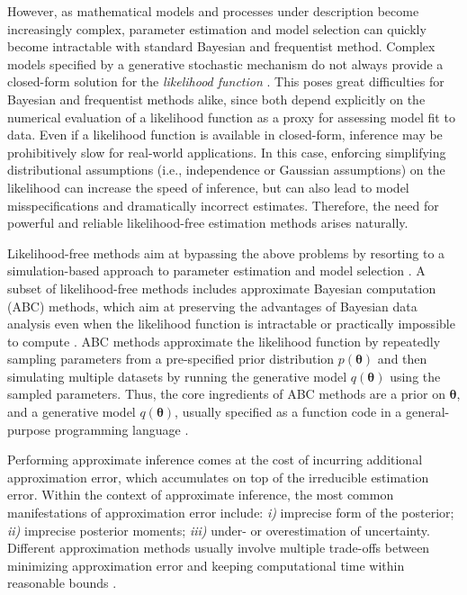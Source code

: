 \documentclass[9pt,twoside,lineno]{pnas-new}
\begin{document}
However, as mathematical models and processes under description become increasingly complex, parameter estimation and model selection can quickly become intractable with standard Bayesian and frequentist method. Complex models specified by a generative stochastic mechanism do not always provide a closed-form solution for the \textit{likelihood function} \cite{palestro2018likelihood, csillery2010approximate, toni2009simulation}. This poses great difficulties for Bayesian and frequentist methods alike, since both depend explicitly on the numerical evaluation of a likelihood function as a proxy for assessing model fit to data. Even if a likelihood function is available in closed-form, inference may be prohibitively slow for real-world applications. In this case, enforcing simplifying distributional assumptions (i.e., independence or Gaussian assumptions) on the likelihood can increase the speed of inference, but can also lead to model misspecifications and dramatically incorrect estimates. Therefore, the need for powerful and reliable likelihood-free estimation methods arises naturally. 

Likelihood-free methods aim at bypassing the above problems by resorting to a simulation-based approach to parameter estimation and model selection \cite{palestro2018likelihood, turner2014generalized}. A subset of likelihood-free methods includes approximate Bayesian computation (ABC) methods, which aim at preserving the advantages of Bayesian data analysis even when the likelihood function is intractable or practically impossible to compute \cite{turner2014generalized, sunnaaker2013approximate, csillery2010approximate}. ABC methods approximate the likelihood function by repeatedly sampling parameters from a pre-specified prior distribution $p(\boldsymbol{\theta})$ and then simulating multiple datasets by running the generative model $q(\boldsymbol{\theta})$ using the sampled parameters. Thus, the core ingredients of ABC methods are a prior on $\boldsymbol{\theta}$, and a generative model $q(\boldsymbol{\theta})$, usually specified as a function code in a general-purpose programming language \cite{csillery2010approximate, mertens2018abrox}.

Performing approximate inference comes at the cost of incurring additional approximation error, which accumulates on top of the irreducible estimation error. Within the context of approximate inference, the most common manifestations of approximation error include: \textit{i)} imprecise form of the posterior; \textit{ii)} imprecise posterior moments; \textit{iii)} under- or overestimation of uncertainty. Different approximation methods usually involve multiple trade-offs between minimizing approximation error and keeping computational time within reasonable bounds \cite{frazier2018asymptotic, palestro2018likelihood}.
\end{document}
